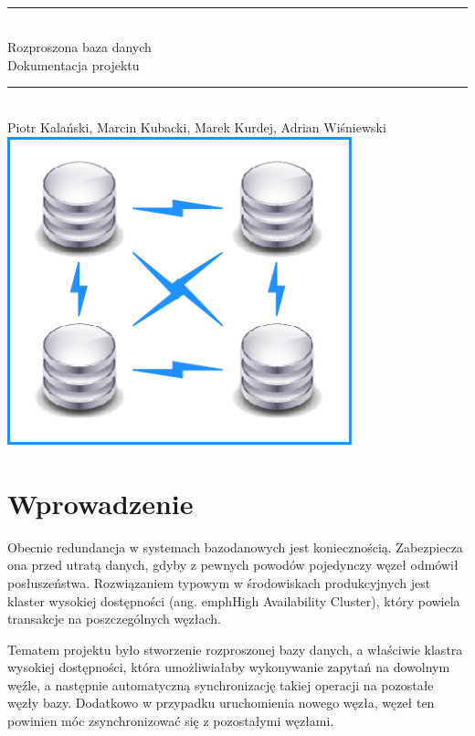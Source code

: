 \documentclass[a4paper, oneside, 11pt]{report}
\date{}
\begin{document}
\begin{titlepage}
\begin{center} 
\textsf{} \\[2cm]
\rule{14cm}{1mm} \\
\textsf{\huge Rozproszona baza danych\\ \large Dokumentacja projektu} \\
\rule{14cm}{1mm} \\
\textsf{Piotr Kalański, Marcin Kubacki, Marek Kurdej, Adrian Wiśniewski} \\
\vspace{3cm}
\includegraphics[width=10cm]{under_title.png}
\end{center}
\end{titlepage}

\pagestyle{headings}
\tableofcontents
\chapter{Wprowadzenie}
Obecnie redundancja w systemach bazodanowych jest koniecznością. Zabezpiecza ona przed utratą danych, gdyby z pewnych powodów pojedynczy węzeł odmówił posłuszeństwa. Rozwiązaniem typowym w środowiskach produkcyjnych jest klaster wysokiej dostępności (ang. emph{High Availability Cluster}), który powiela transakcje na poszczególnych węzłach. 

Tematem projektu było stworzenie rozproszonej bazy danych, a właściwie klastra wysokiej dostępności, która umożliwiałaby wykonywanie zapytań na dowolnym węźle, a następnie automatyczną synchronizację takiej operacji na pozostałe węzły bazy. Dodatkowo w przypadku uruchomienia nowego węzła, węzeł ten powinien móc zsynchronizować się z pozostałymi węzłami. 
\end{document}
